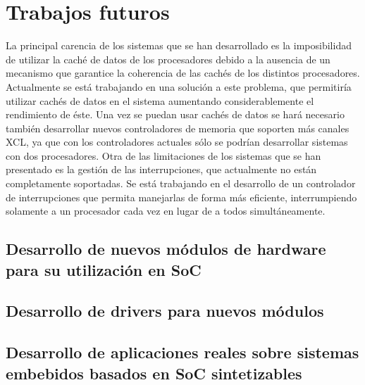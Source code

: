 	\section{Trabajos futuros}

La principal carencia de los sistemas que se han desarrollado es la imposibilidad de utilizar la caché de datos de los procesadores debido a la ausencia de un mecanismo que garantice la coherencia de las cachés de los distintos procesadores. Actualmente se está trabajando en una solución a este problema, que permitiría utilizar cachés de datos en el sistema aumentando considerablemente el rendimiento de éste. Una vez se puedan usar cachés de datos se hará necesario también desarrollar nuevos controladores de memoria que soporten más canales XCL, ya que con los controladores actuales sólo se podrían desarrollar sistemas con dos procesadores. Otra de las limitaciones de los sistemas que se han presentado es la gestión de las interrupciones, que actualmente no están completamente soportadas. Se está trabajando en el desarrollo de un controlador de interrupciones que permita manejarlas de forma más eficiente, interrumpiendo solamente a un procesador cada vez en lugar de a todos simultáneamente.

		\subsection{Desarrollo de nuevos módulos de hardware para su utilización en SoC}
		
		\subsection{Desarrollo de drivers para nuevos módulos}
		
		\subsection{Desarrollo de aplicaciones reales sobre sistemas embebidos basados en SoC sintetizables}
		
		
	
	 